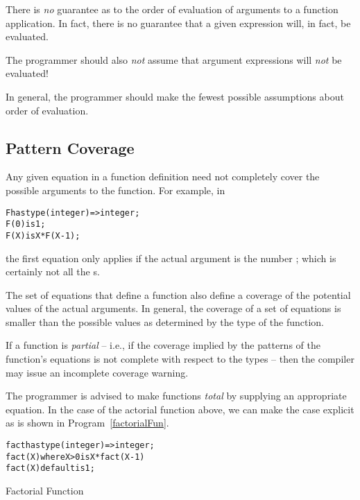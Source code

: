 There is \emph{no} guarantee as to the order of evaluation of arguments to a function application. In fact, there is no guarantee that a given expression will, in fact, be evaluated.

\begin{aside}
The programmer should also \emph{not} assume that argument expressions will \emph{not} be evaluated!

In general, the programmer should make the fewest possible assumptions about order of evaluation.
\end{aside}

\subsection{Pattern Coverage}
\label{patternCoverage}
Any given equation in a function definition need not completely cover the possible arguments to the function. For example, in
\begin{alltt}
F has type (integer)=>integer;
F(0) is 1;
F(X) is X*F(X-1);
\end{alltt}
the first equation only applies if the actual argument is the number ; which is certainly not all the s.

The set of equations that define a function also define a coverage of the potential values of the actual arguments. In general, the coverage of a set of equations is smaller than the possible values as determined by the type of the function.

If a function is \emph{partial} -- i.e., if the coverage implied by the patterns of the function's equations is not complete with respect to the types -- then the compiler may issue an incomplete coverage warning.

\begin{aside}
The programmer is advised to make functions \emph{total} by supplying an appropriate  equation. In the case of the actorial function above, we can make the  case explicit as is shown in Program~\vref{factorialFun}.
\end{aside}

\begin{program}
\begin{alltt}
fact has type (integer)=>integer;
fact(X) where X>0 is X*fact(X-1)
fact(X) default is 1;
\end{alltt}
\caption{Factorial Function\label{factorialFun}}
\end{program}

